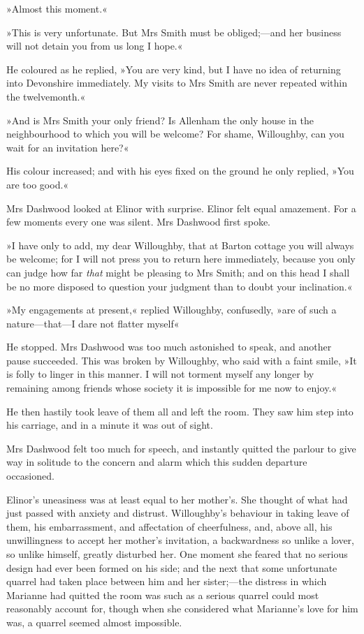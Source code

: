 »Almost this moment.«

»This is very unfortunate. But Mrs Smith must be obliged;—and her business will not detain you from us long I hope.«

He coloured as he replied, »You are very kind, but I have no idea of returning into Devonshire immediately. My visits to Mrs Smith are never repeated within the twelvemonth.«

»And is Mrs Smith your only friend? Is Allenham the only house in the neighbourhood to which you will be welcome? For shame, Willoughby, can you wait for an invitation here?«

His colour increased; and with his eyes fixed on the ground he only replied, »You are too good.«

Mrs Dashwood looked at Elinor with surprise. Elinor felt equal amazement. For a few moments every one was silent. Mrs Dashwood first spoke.

»I have only to add, my dear Willoughby, that at Barton cottage you will always be welcome; for I will not press you to return here immediately, because you only can judge how far \textit{that} might be pleasing to Mrs Smith; and on this head I shall be no more disposed to question your judgment than to doubt your inclination.«

»My engagements at present,« replied Willoughby, confusedly, »are of such a nature—that—I dare not flatter myself\longdash«

He stopped. Mrs Dashwood was too much astonished to speak, and another pause succeeded. This was broken by Willoughby, who said with a faint smile, »It is folly to linger in this manner. I will not torment myself any longer by remaining among friends whose society it is impossible for me now to enjoy.«

He then hastily took leave of them all and left the room. They saw him step into his carriage, and in a minute it was out of sight.

Mrs Dashwood felt too much for speech, and instantly quitted the parlour to give way in solitude to the concern and alarm which this sudden departure occasioned.

Elinor’s uneasiness was at least equal to her mother’s. She thought of what had just passed with anxiety and distrust. Willoughby’s behaviour in taking leave of them, his embarrassment, and affectation of cheerfulness, and, above all, his unwillingness to accept her mother’s invitation, a backwardness so unlike a lover, so unlike himself, greatly disturbed her. One moment she feared that no serious design had ever been formed on his side; and the next that some unfortunate quarrel had taken place between him and her sister;—the distress in which Marianne had quitted the room was such as a serious quarrel could most reasonably account for, though when she considered what Marianne’s love for him was, a quarrel seemed almost impossible.

